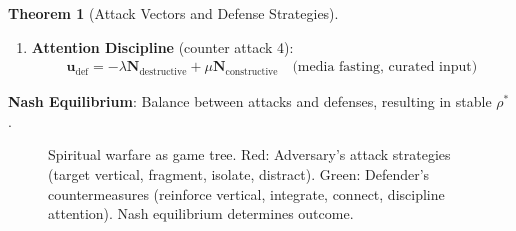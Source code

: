 \documentclass[11pt,a4paper]{article}
\theoremstyle{definition}
\newtheorem{theorem}{Theorem}[section]
\theoremstyle{remark}
\newcommand{\cc}{\mathbf{c}}
\begin{document}
\begin{small}
\begin{enumerate}
\begin{theorem}[Attack Vectors and Defense Strategies]
\begin{enumerate}
    \item \textbf{Attention Discipline} (counter attack 4):
        \begin{align}
        \mathbf{u}_{\text{def}} = -\lambda \mathbf{N}_{\text{destructive}} + \mu \mathbf{N}_{\text{constructive}} \quad \text{(media fasting, curated input)}
        \end{align}
\end{enumerate}

\textbf{Nash Equilibrium}: Balance between attacks and defenses, resulting in stable \(\rho^*\).
\end{theorem}

\begin{figure}[H]
\centering
{}
\caption{Spiritual warfare as game tree. Red: Adversary's attack strategies (target vertical, fragment, isolate, distract). Green: Defender's countermeasures (reinforce vertical, integrate, connect, discipline attention). Nash equilibrium determines outcome.}
\label{fig:spiritual_warfare_game}
\end{figure}


\end{enumerate}
\end{small}
\end{document}
